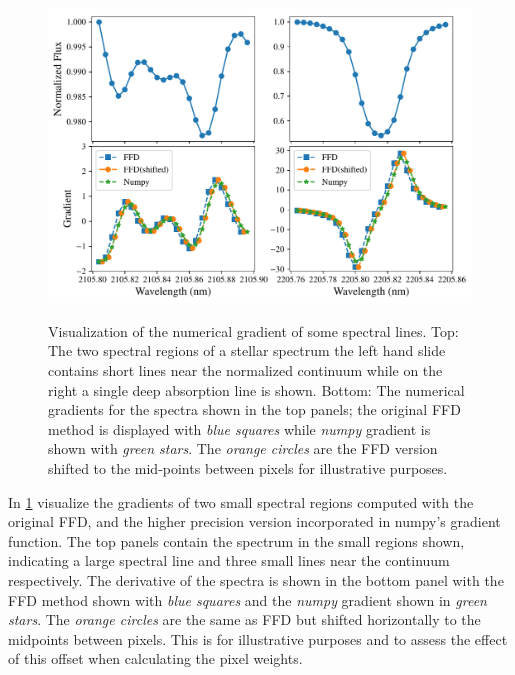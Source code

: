 {\begin{figure}
    \centering
    \includegraphics[width=0.8\linewidth]{figures/information-content/spectral_gradients}\\
    \caption[Comparing of numerical gradient alogithms.]{Visualization of the numerical gradient of some spectral lines.
        Top: The two spectral regions of a stellar spectrum the left hand slide contains short lines near the normalized continuum while on the right a single deep absorption line is shown.
        Bottom: The numerical gradients for the spectra shown in the top panels; the original {FFD} method is displayed with \emph{blue squares} while \emph{numpy} gradient is shown with \emph{green stars}.
        The \emph{orange circles} are the {FFD} version shifted to the mid-points between pixels for illustrative purposes.}
    \label{fig:gradients}
\end{figure}




In \cref{fig:gradients}  visualize the gradients of two small spectral regions computed with the original {FFD}, and the higher precision version incorporated in numpy's gradient function.
The top panels contain the spectrum in the small regions shown, indicating a large spectral line and three small lines near the continuum respectively.
The derivative of the spectra is shown in the bottom panel with the {FFD} method shown with \emph{blue squares} and the \emph{numpy} gradient shown in \emph{green stars}.
The \emph{orange circles} are the same as {FFD} but shifted horizontally to the midpoints between pixels.
This is for illustrative purposes and to assess the effect of this offset when calculating the pixel weights.

}

